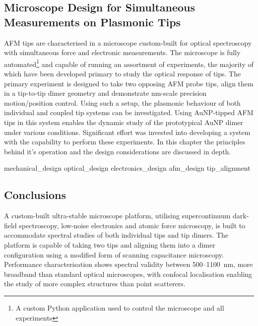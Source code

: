 \documentclass[12pt, a4paper, twoside]{book}
\begin{document}
\begin{singlespace}
{\color{yellow}
\chapter{Microscope Design for Simultaneous Measurements on Plasmonic Tips}}
\end{singlespace}


AFM tips are characterised in a microscope custom-built for optical spectroscopy with simultaneous force and electronic measurements. The microscope is fully automated\footnote{A custom Python application used to control the microscope and all experiments} and capable of running an assortment of experiments, the majority of which have been developed primary to study the optical response of tips.
The primary experiment is designed to take two opposing AFM probe tips, align them in a tip-to-tip dimer geometry and demonstrate nm-scale precision motion/position control. Using such a setup, the plasmonic behaviour of both individual and coupled tip systems can be investigated. Using AuNP-tipped AFM tips in this system enables the dynamic study of the prototypical AuNP dimer under various conditions. Significant effort was invested into developing a system with the capability to perform these experiments. In this chapter the principles behind it's operation and the design considerations are discussed in depth.

{mechanical_design}
{optical_design}
{electronics_design}
{afm_design}
{tip_alignment}

\section{Conclusions}

A custom-built ultra-stable microscope platform, utilising supercontinuum dark-field spectroscopy, low-noise electronics and atomic force microscopy, is built to accommodate spectral studies of both individual tips and tip dimers. The platform is capable of taking two tips and aligning them into a dimer configuration using a modified form of scanning capacitance microscopy. Performance characterisation shows spectral validity between 500--\SI{1100}{nm}, more broadband than standard optical microscopes, with confocal localisation enabling the study of more complex structures than point scatterers.

\ifstandalone
\begin{singlespace}
\printbibliography[notcategory=fullcited]
\end{singlespace}
\fi
\end{document}
